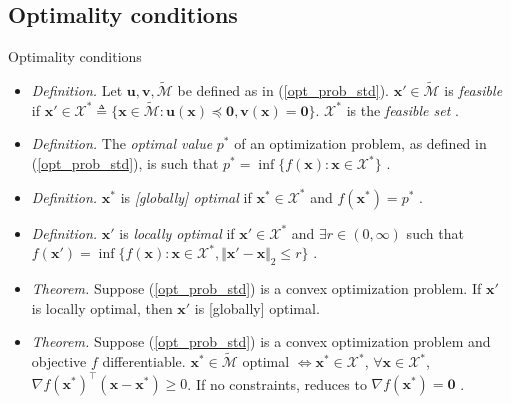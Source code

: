 \documentclass{beamer}
\numberwithin{equation}{section}
\newcommand{\aref}[1]{\alert{\ref{#1}}}
\begin{document}
\subsection{Optimality conditions}

\begin{frame}{Optimality conditions}
    \begin{itemize}
        \item
        \textit{Definition.} Let $ \mathbf{u}, \mathbf{v},
        \tilde{\mathcal{M}} $ be defined as in (\aref{opt_prob_std}).
        $ \mathbf{x}' \in \tilde{\mathcal{M}} $ is \textit{feasible} if
        $ \mathbf{x}' \in \mathcal{X}^*
        \triangleq \{\mathbf{x} \in \tilde{\mathcal{M}} :
        \mathbf{u}(\mathbf{x}) \preceq \mathbf{0}, \mathbf{v}(\mathbf{x}) =
        \mathbf{0}\} $. $ \mathcal{X}^* $ is the \textit{feasible set}
        \cite{bv_convex_opt}.

        \item
        \textit{Definition.} The \textit{optimal value} $ p^* $
        of an optimization problem, as defined in (\aref{opt_prob_std}), is
        such that $ p^* = \inf\{f(\mathbf{x}) : \mathbf{x} \in
        \mathcal{X}^*\} $ \cite{bv_convex_opt}.

        \item
        \textit{Definition.} $ \mathbf{x}^* $ is \textit{[globally] optimal}
        if $ \mathbf{x}^* \in \mathcal{X}^* $ and $ f(\mathbf{x}^*) = p^* $ 
        \cite{bv_convex_opt}.

        \item
        \textit{Definition.} $ \mathbf{x}' $ is \textit{locally optimal} if
        $ \mathbf{x}' \in \mathcal{X}^* $ and $ \exists r \in (0, \infty) $
        such that $ f(\mathbf{x}') = \inf\{
            f(\mathbf{x}) : \mathbf{x} \in \mathcal{X}^*,
            \Vert\mathbf{x}' - \mathbf{x}\Vert_2 \le r
        \}$ \cite{bv_convex_opt}.

        \item
        \textit{Theorem.} Suppose (\aref{opt_prob_std}) is a convex
        optimization problem. If $ \mathbf{x}' $ is locally optimal, then
        $ \mathbf{x}' $ is [globally] optimal.

        \item
        \textit{Theorem.} Suppose (\aref{opt_prob_std}) is a convex
        optimization problem and objective $ f $ differentiable.
        $ \mathbf{x}^* \in \tilde{\mathcal{M}} $ optimal
        $ \Leftrightarrow \mathbf{x}^* \in \mathcal{X}^* $,
        $ \forall \mathbf{x} \in \mathcal{X}^* $,
        $ \nabla f(\mathbf{x}^*)^\top(\mathbf{x} - \mathbf{x}^*) \ge 0 $.
        If no constraints, reduces to $ \nabla f(\mathbf{x}^*) = \mathbf{0} $
        \cite{bv_convex_opt}.
    \end{itemize}
\end{frame}
\end{document}

